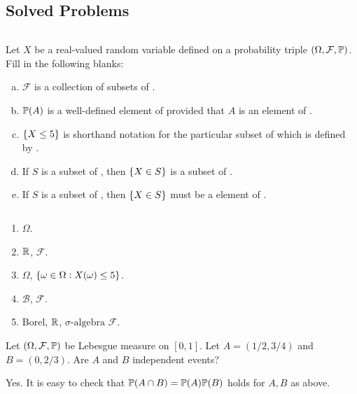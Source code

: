 \subsection{Solved Problems}
\[  \]
\begin{problem}
	Let $ X $ be a real-valued random variable defined on a probability triple $ (\Omega, \mathcal{F},\mathbb{P}) $. Fill in the following blanks:
	\begin{enumerate}[(a)]
		\item $ \mathcal{F} $ is a collection of subsets of \blank.
		\item $ \mathbb{P}(A) $ is a well-defined element of \blank provided that $ A $ is an element of \blank.
		\item $ \{X\leq 5\} $ is shorthand notation for the particular subset of \blank which is defined by \blank.
		\item If $ S $ is a subset of \blank, then $ \{X\in S\} $ is a subset of \blank.
		\item If $ S $ is a \blank subset of \blank, then $ \{X \in S\} $ must be a element of \blank.
	\end{enumerate}
\end{problem}
\begin{solution}
	$ \quad $
	\begin{enumerate}[noitemsep]
		\item $ \Omega $.
		\item $ \mathbb{R} $, $ \mathcal{F} $.
		\item $ \Omega $, $ \{\omega\in \Omega: X(\omega)\leq 5\} $.
		\item $ \mathcal{B} $, $ \mathcal{F} $.
		\item Borel, $ \mathbb{R} $, $\sigma\text{-algebra}$ $ \mathcal{F} $.
	\end{enumerate}
\end{solution}

\begin{problem}
	Let $ (\Omega, \mathcal{F},\mathbb{P}) $ be Lebesgue measure on $ [0,1] $. Let $ A = (1/2,3/4) $ and $ B = (0,2/3) $. Are $ A $ and $ B $ independent events?
\end{problem}
\begin{solution}
	Yes. It is easy to check that  $ \mathbb{P}(A \cap B) = \mathbb{P}(A) \mathbb{P}(B) $ holds for $ A,B $ as above.
\end{solution}


